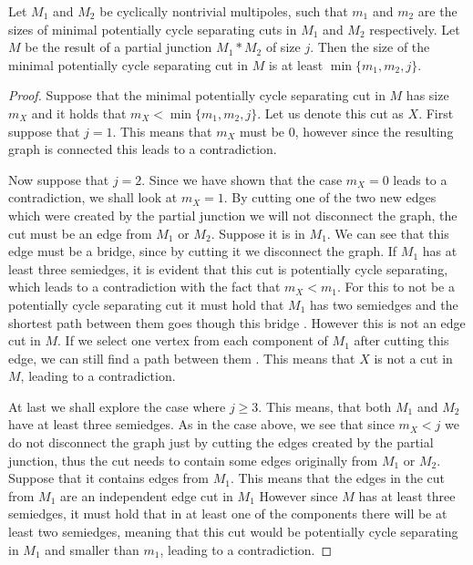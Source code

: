 \documentclass[12pt, twoside]{book}
\begin{document}
\begin{lemma}\label{lem:size-of-minimal-potentially-cycle-separating-after-junction}
	Let $M_1$ and $M_2$ be cyclically nontrivial multipoles, such that $m_1$ and $m_2$ are the sizes of minimal potentially cycle separating cuts in $M_1$ and $M_2$ respectively. Let $M$ be the result of a partial junction $M_1*M_2$ of size $j$. Then the size of the minimal potentially cycle separating cut in $M$ is at least $\min\{m_1,m_2,j\}$.
\end{lemma}

\begin{proof}
	Suppose that the minimal potentially cycle separating cut in $M$ has size $m_X$ and it holds that $m_X<\min\{m_1,m_2,j\}$. Let us denote this cut as $X$. First suppose that $j=1$. This means that $m_X$ must be 0, however since the resulting graph is connected  this leads to a contradiction.
	
	Now suppose that $j=2$. Since we have shown that the case $m_X=0$ leads to a contradiction, we shall look at $m_X=1$. By cutting one of the two new edges which were created by the partial junction we will not disconnect the graph, the cut must be an edge from $M_1$ or $M_2$. Suppose it is in $M_1$. We can see that this edge must be a bridge, since by cutting it we disconnect the graph. If $M_1$ has at least three semiedges, it is evident that this cut is potentially cycle separating, which leads to a contradiction with the fact that $m_X<m_1$. For this to not be a potentially cycle separating cut it must hold that $M_1$ has two semiedges and the shortest path between them goes though this bridge . However this is not an edge cut in $M$. If we select one vertex from each component of $M_1$ after cutting this edge, we can still find a path between them . This means that $X$ is not a cut in $M$, leading to a contradiction.
	
	At last we shall explore the case where $j\geq 3$. This means, that both $M_1$ and $M_2$ have at least three semiedges. As in the case above, we see that since $m_X<j$ we do not disconnect the graph just by cutting the edges created by the partial junction, thus the cut needs to contain some edges originally from $M_1$ or $M_2$. Suppose that it contains edges from $M_1$. This means that the edges in the cut from $M_1$ are an independent edge cut in $M_1$  However since $M$ has at least three semiedges, it must hold that in at least one of the components there will be at least two semiedges, meaning that this cut would be potentially cycle separating in $M_1$ and smaller than $m_1$, leading to a contradiction.
	
\end{proof}
\end{document}
